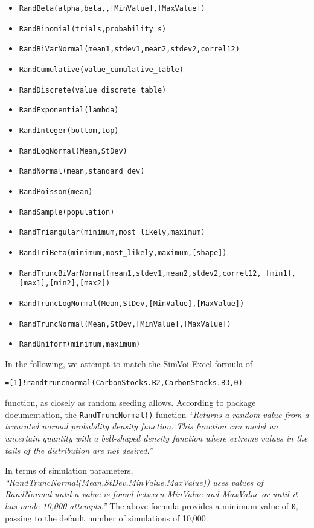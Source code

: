 \documentclass[
]{article}
\providecommand{\tightlist}{%
  \setlength{\itemsep}{0pt}\setlength{\parskip}{0pt}}
\begin{document}
\begin{itemize}
\tightlist
\item
  \texttt{RandBeta(alpha,beta,,{[}MinValue{]},{[}MaxValue{]})}
\item
  \texttt{RandBinomial(trials,probability\_s)}
\item
  \texttt{RandBiVarNormal(mean1,stdev1,mean2,stdev2,correl12)}
\item
  \texttt{RandCumulative(value\_cumulative\_table)}
\item
  \texttt{RandDiscrete(value\_discrete\_table)}
\item
  \texttt{RandExponential(lambda)}
\item
  \texttt{RandInteger(bottom,top)}
\item
  \texttt{RandLogNormal(Mean,StDev)}
\item
  \texttt{RandNormal(mean,standard\_dev)}
\item
  \texttt{RandPoisson(mean)}
\item
  \texttt{RandSample(population)}
\item
  \texttt{RandTriangular(minimum,most\_likely,maximum)}
\item
  \texttt{RandTriBeta(minimum,most\_likely,maximum,{[}shape{]})}
\item
  \texttt{RandTruncBiVarNormal(mean1,stdev1,mean2,stdev2,correl12,\ {[}min1{]},{[}max1{]},{[}min2{]},{[}max2{]})}
\item
  \texttt{RandTruncLogNormal(Mean,StDev,{[}MinValue{]},{[}MaxValue{]})}
\item
  \texttt{RandTruncNormal(Mean,StDev,{[}MinValue{]},{[}MaxValue{]})}
\item
  \texttt{RandUniform(minimum,maximum)}
\end{itemize}

In the following, we attempt to match the SimVoi Excel formula of

\texttt{={[}1{]}!randtruncnormal(CarbonStocks.B2,CarbonStocks.B3,0)}

function, as closely as random seeding allows. According to package
documentation, the \texttt{RandTruncNormal()} function ``\emph{Returns a
random value from a truncated normal probability density function. This
function can model an uncertain quantity with a bell-shaped density
function where extreme values in the tails of the distribution are not
desired.''}

In terms of simulation parameters,
\emph{``RandTruncNormal(Mean,StDev,MinValue,MaxValue)) uses values of
RandNormal until a value is found between MinValue and MaxValue or until
it has made 10,000 attempts.''} The above formula provides a minimum
value of \texttt{0}, passing to the default number of simulations of
10,000.
\end{document}
